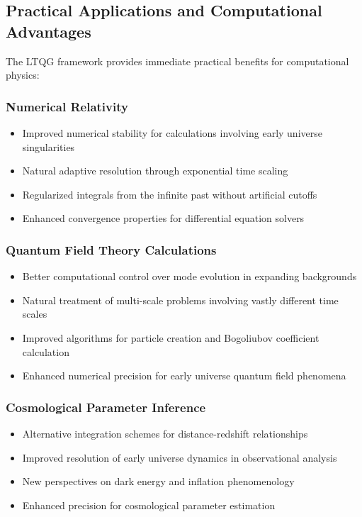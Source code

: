 \subsection{Practical Applications and Computational Advantages}
\label{subsec:practical_applications}

The LTQG framework provides immediate practical benefits for computational physics:

\subsubsection{Numerical Relativity}

\begin{itemize}
\item Improved numerical stability for calculations involving early universe singularities
\item Natural adaptive resolution through exponential time scaling
\item Regularized integrals from the infinite past without artificial cutoffs
\item Enhanced convergence properties for differential equation solvers
\end{itemize}

\subsubsection{Quantum Field Theory Calculations}

\begin{itemize}
\item Better computational control over mode evolution in expanding backgrounds
\item Natural treatment of multi-scale problems involving vastly different time scales
\item Improved algorithms for particle creation and Bogoliubov coefficient calculation
\item Enhanced numerical precision for early universe quantum field phenomena
\end{itemize}

\subsubsection{Cosmological Parameter Inference}

\begin{itemize}
\item Alternative integration schemes for distance-redshift relationships
\item Improved resolution of early universe dynamics in observational analysis
\item New perspectives on dark energy and inflation phenomenology
\item Enhanced precision for cosmological parameter estimation
\end{itemize}

